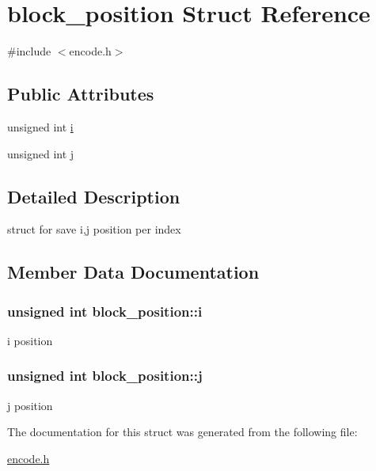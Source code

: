 \hypertarget{structblock__position}{}\section{block\+\_\+position Struct Reference}
\label{structblock__position}


{\ttfamily \#include $<$encode.\+h$>$}

\subsection*{Public Attributes}
\begin{DoxyCompactItemize}
\item 
unsigned int \hyperlink{structblock__position_a871db3ba2f3403e328d94c1b5ceffbe6}{i}
\item 
unsigned int \hyperlink{structblock__position_a475229395584431374559d5ef9dbfa9f}{j}
\end{DoxyCompactItemize}


\subsection{Detailed Description}
struct for save i,j position per index 

\subsection{Member Data Documentation}
\hypertarget{structblock__position_a871db3ba2f3403e328d94c1b5ceffbe6}{}
\subsubsection[{i}]{\setlength{\rightskip}{0pt plus 5cm}unsigned int block\+\_\+position\+::i}\label{structblock__position_a871db3ba2f3403e328d94c1b5ceffbe6}
i position \hypertarget{structblock__position_a475229395584431374559d5ef9dbfa9f}{}
\subsubsection[{j}]{\setlength{\rightskip}{0pt plus 5cm}unsigned int block\+\_\+position\+::j}\label{structblock__position_a475229395584431374559d5ef9dbfa9f}
j position 

The documentation for this struct was generated from the following file\+:\begin{DoxyCompactItemize}
\item 
\hyperlink{encode_8h}{encode.\+h}\end{DoxyCompactItemize}
